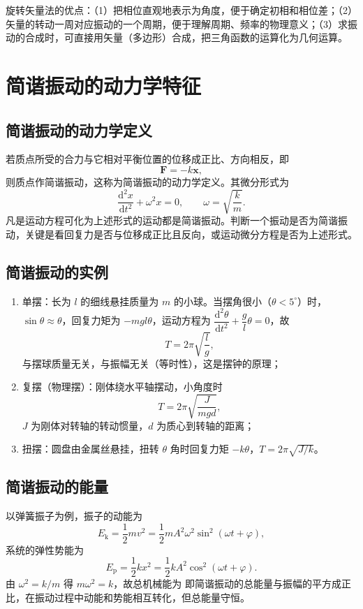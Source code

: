     旋转矢量法的优点：（1）把相位直观地表示为角度，便于确定初相和相位差；（2）矢量的转动一周对应振动的一个周期，便于理解周期、频率的物理意义；（3）求振动的合成时，可直接用矢量（多边形）合成，把三角函数的运算化为几何运算。


\section{简谐振动的动力学特征}
    \subsection{简谐振动的动力学定义}
    若质点所受的合力与它相对平衡位置的位移成正比、方向相反，即
    \[
    \boldsymbol{F}=-k\boldsymbol{x},
    \]
    则质点作简谐振动，这称为简谐振动的动力学定义。其微分形式为
    \[
    \frac{\mathrm{d}^{2}x}{\mathrm{d}t^{2}}+\omega^{2}x=0,\qquad \omega=\sqrt{\frac{k}{m}}.
    \]
    凡是运动方程可化为上述形式的运动都是简谐振动。判断一个振动是否为简谐振动，关键是看回复力是否与位移成正比且反向，或运动微分方程是否为上述形式。

    \subsection{简谐振动的实例}
    \begin{enumerate}
        \item 单摆：长为 $l$ 的细线悬挂质量为 $m$ 的小球。当摆角很小（$\theta<5^{\circ}$）时，$\sin\theta\approx\theta$，回复力矩为 $-mgl\theta$，运动方程为 $\dfrac{\mathrm{d}^{2}\theta}{\mathrm{d}t^{2}}+\dfrac{g}{l}\theta=0$，故
        \[
        T=2\pi\sqrt{\frac{l}{g}},
        \]
        与摆球质量无关，与振幅无关（等时性），这是摆钟的原理；
        \item 复摆（物理摆）：刚体绕水平轴摆动，小角度时
        \[
        T=2\pi\sqrt{\frac{J}{mgd}},
        \]
        $J$ 为刚体对转轴的转动惯量，$d$ 为质心到转轴的距离；
        \item 扭摆：圆盘由金属丝悬挂，扭转 $\theta$ 角时回复力矩 $-k\theta$，$T=2\pi\sqrt{J/k}$。
    \end{enumerate}

    \subsection{简谐振动的能量}
    以弹簧振子为例，振子的动能为
    \[
    E_\mathrm{k}=\frac{1}{2}mv^{2}=\frac{1}{2}mA^{2}\omega^{2}\sin^{2}(\omega t+\varphi),
    \]
    系统的弹性势能为
    \[
    E_\mathrm{p}=\frac{1}{2}kx^{2}=\frac{1}{2}kA^{2}\cos^{2}(\omega t+\varphi).
    \]
    由 $\omega^{2}=k/m$ 得 $m\omega^{2}=k$，故总机械能为
    即简谐振动的总能量与振幅的平方成正比，在振动过程中动能和势能相互转化，但总能量守恒。

